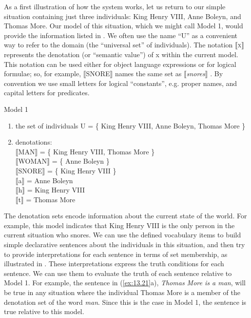 As a first illustration of how the system works, let us return to our simple situation containing just three individuals: King Henry VIII, Anne Boleyn, and Thomas More. Our model of this situation, which we might call Model 1, would provide the information listed in . We often use the name “U” as a convenient way to refer to the domain (the “universal set” of individuals). The notation \textsc{$\llbracket$x}$\rrbracket$  represents the denotation (or “semantic value”) of x within the current model. This notation can be used either for object language expressions or for logical formulae; so, for example, $\llbracket$SNORE$\rrbracket$  names the same set as $\llbracket$\textit{snores}$\rrbracket$ . By convention we use small letters for logical “constants”, e.g. proper names, and capital letters for predicates.


\ea \label{ex:13.20}Model 1\\
\begin{enumerate}[label=\roman*.]
\item the set of individuals U = \{ King Henry VIII, Anne Boleyn, Thomas More \}
\item denotations\textsc{:\\
{}$\llbracket$}\textsc{MAN}$\rrbracket$  = \{ King Henry VIII, Thomas More \}\\
\textsc{$\llbracket$}WOMAN$\rrbracket$  = \{ Anne Boleyn \}\\
\textsc{$\llbracket$}SNORE$\rrbracket$  = \{ King Henry VIII \}\\
\textsc{$\llbracket$}a$\rrbracket$  = Anne Boleyn\\
\textsc{$\llbracket$}h$\rrbracket$  = King Henry VIII\\
\textsc{$\llbracket$}t$\rrbracket$  = Thomas More
\end{enumerate}
\z

The denotation sets encode information about the current state of the world. For example, this model indicates that King Henry VIII is the only person in the current situation who snores. We can use the defined vocabulary items to build simple declarative sentences about the individuals in this situation, and then try to provide interpretations for each sentence in terms of set membership, as illustrated in . These interpretations express the truth conditions for each sentence. We can use them to evaluate the truth of each sentence relative to Model 1. For example, the sentence in (\ref{ex:13.21}a), \textit{Thomas More is a man}, will be true in any situation where the individual Thomas More is a member of the denotation set of the word \textit{man}. Since this is the case in Model 1, the sentence is true relative to this model.



